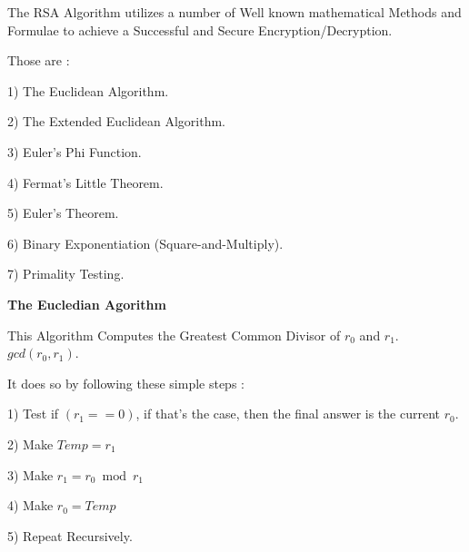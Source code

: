 \documentclass{slides}
\begin{document}
\begin{center}
The RSA Algorithm utilizes a number of Well known mathematical Methods and Formulae to achieve a Successful and Secure Encryption/Decryption.
\end{center}
\begin{center}
Those are :
\end{center}
\begin{center}
1) The Euclidean Algorithm.
\end{center}
\begin{center}
2) The Extended Euclidean Algorithm.
\end{center}
\begin{center}
3) Euler's Phi Function.
\end{center}
\begin{center}
4) Fermat's Little Theorem.
\end{center}
\begin{center}
5) Euler's Theorem.
\end{center}
\begin{center}
6) Binary Exponentiation (Square-and-Multiply).
\end{center}
\begin{center}
7) Primality Testing.
\end{center}
\newpage
\begin{center}
\textbf{\Large The Eucledian Agorithm}
\end{center}
\begin{center}
This Algorithm Computes the Greatest Common Divisor of $ r_{0} $ and $ r_{1} $. $ gcd(r_{0},r_{1}) $.
\end{center}
\begin{center}
It does so by following these simple steps :
\end{center}
\begin{center}
1) Test if $ (r_{1} == 0) $, if that's the case, then the final answer is the current $ r_{0} $.
\end{center}
\begin{center}
2) Make $ Temp = r_{1} $
\end{center}
\begin{center}
3) Make $r_{1} = r_{0} \bmod r_{1}$
\end{center}
\begin{center}
4) Make $ r_{0} = Temp $
\end{center}
\begin{center}
5) Repeat Recursively.
\end{center}
\newpage
\end{document}
